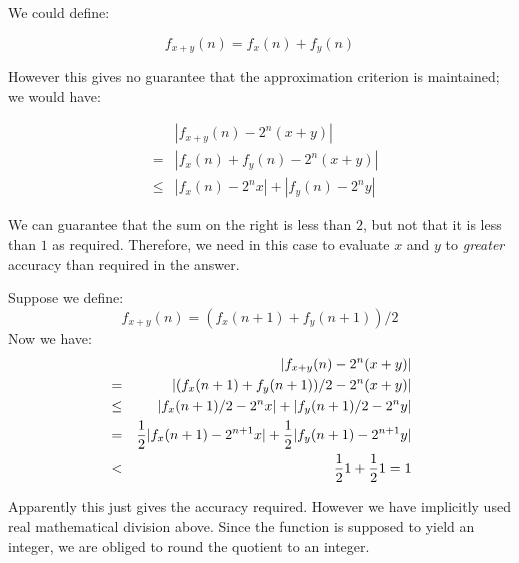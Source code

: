 \begin{slide*}


\vspace*{0.5cm}

We could define:

{\red $$ f_{x + y}(n) = f_x(n) + f_y(n) $$}

However this gives no guarantee that the approximation criterion is maintained;
we would have:

{\red \begin{eqnarray*}
&      & |f_{x + y}(n) - 2^n (x + y)| \\
& =    & |f_x(n) + f_y(n) - 2^n (x + y)|      \\
& \leq & |f_x(n) - 2^n x| + |f_y(n) - 2^n y|
\end{eqnarray*}}

We can guarantee that the sum on the right is less than {\red $2$}, but not that it is
less than {\red $1$} as required. Therefore, we need in this case to evaluate {\red $x$} and
{\red $y$} to {\em greater} accuracy than required in the answer.

\end{slide*}


\begin{slide*}


\vspace*{0.5cm}

Suppose we define:
{\red $$ f_{x + y}(n) = (f_x(n + 1) + f_y(n + 1)) / 2 $$}
\noindent Now we have:
{\red \begin{eqnarray*}
&   & |f_{x + y}(n) - 2^n (x + y)|                              \\
& = & |(f_x(n + 1) + f_y(n + 1)) / 2 - 2^n (x + y)|             \\
& \leq & |f_x(n + 1) / 2 - 2^n x| + |f_y(n + 1) / 2 - 2^n y|    \\
& = & {1 \over 2} |f_x(n + 1) - 2^{n + 1} x| +
      {1 \over 2} |f_y(n + 1) - 2^{n + 1} y|                    \\
& < & {1 \over 2} 1 + {1 \over 2} 1 = 1
\end{eqnarray*}}

Apparently this just gives the accuracy required. However we have implicitly
used real mathematical division above. Since the function is supposed to yield
an integer, we are obliged to round the quotient to an integer.

\end{slide*}




